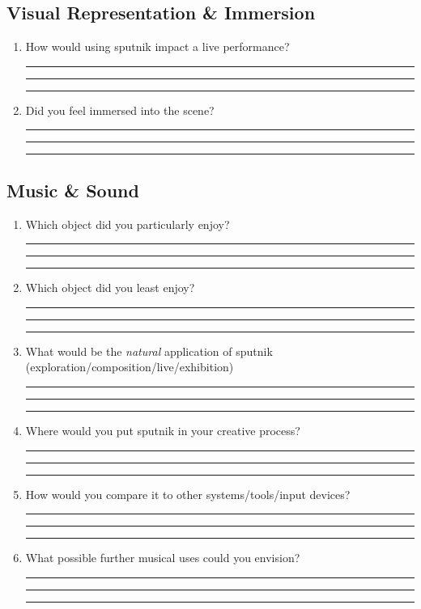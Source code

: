 \documentclass[10pt,a4paper]{scrartcl}
\begin{document}
\subsection{Visual Representation \& Immersion}
\begin{enumerate}

\item How would using sputnik impact a live performance?\\
\rule{\linewidth}{0.25pt}
\rule{\linewidth}{0.25pt}
\rule{\linewidth}{0.25pt}

\item Did you feel immersed into the scene?\\
\rule{\linewidth}{0.25pt}
\rule{\linewidth}{0.25pt}
\rule{\linewidth}{0.25pt}

\end{enumerate}

\subsection{Music \& Sound}
\begin{enumerate}

\item Which object did you particularly enjoy?\\
\rule{\linewidth}{0.25pt}
\rule{\linewidth}{0.25pt}
\rule{\linewidth}{0.25pt}

\item Which object did you least enjoy?\\
\rule{\linewidth}{0.25pt}
\rule{\linewidth}{0.25pt}
\rule{\linewidth}{0.25pt}

\item What would be the \emph{natural} application of sputnik (exploration/composition/live/exhibition)\\
\rule{\linewidth}{0.25pt}
\rule{\linewidth}{0.25pt}
\rule{\linewidth}{0.25pt}

\item Where would you put sputnik in your creative process?\\
\rule{\linewidth}{0.25pt}
\rule{\linewidth}{0.25pt}
\rule{\linewidth}{0.25pt}

\item How would you compare it to other systems/tools/input devices?\\
\rule{\linewidth}{0.25pt}
\rule{\linewidth}{0.25pt}
\rule{\linewidth}{0.25pt}

\item What possible further musical uses could you envision?\\
\rule{\linewidth}{0.25pt}
\rule{\linewidth}{0.25pt}
\rule{\linewidth}{0.25pt}





\end{enumerate}
\end{document}

